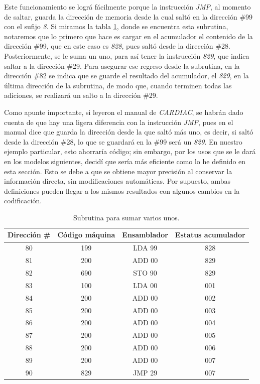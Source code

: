 \documentclass[letterpaper,12pt,oneside]{book}
\begin{document}
	Este funcionamiento se lográ fácilmente porque la instrucción \textit{JMP}, al momento de saltar, guarda la 
	dirección de memoria desde la cual saltó en la dirección \#99 con el sufijo \textit{8}. Si miramos la tabla \ref{tab:subrutina}, donde se encuentra
	esta subrutina, notaremos que lo primero que hace es cargar en el acumulador el contenido de la dirección \#99, que en
	este caso es \textit{828}, pues saltó desde la dirección \#28. Posteriormente, se le suma un uno,
	para así tener la instrucción \textit{829}, que indica saltar a la dirección \#29. Para asegurar ese regreso desde la subrutina, en la dirección
	\#82 se indica que se guarde el resultado del acumulador, el \textit{829}, en la última dirección de la subrutina, de modo que, cuando terminen todas las adiciones,
	se realizará un salto a la dirección \#29.
	
	Como apunte importante, si leyeron el manual
	de \textit{CARDIAC}, se habrán dado cuenta de que hay una ligera diferencia con la instrucción \textit{JMP}, pues en el manual dice que guarda la dirección
	desde la que saltó más uno, es decir, si saltó desde la dirección \#28, lo que se guardará en la \#99 será  un \textit{829}. En nuestro ejemplo particular, esto ahorraría código; sin embargo, por los usos que se le dará en los modelos siguientes, decidí que sería más eficiente como lo he definido en esta sección. Esto se debe a que se obtiene mayor precisión al conservar la información directa, sin modificaciones automáticas. Por supuesto, ambas definiciones pueden llegar a los
	mismos resultados con algunos cambios en la codificación.
	
	\begin{table}[h]
	  \centering
	  \begin{tabular}{|c|c|c|c|}
	    \hline
    	\textbf{Dirección \#} & \textbf{Código máquina} & \textbf{Ensamblador} & \textbf{Estatus acumulador} \\
	    \hline
	     80 & 199 & LDA 99 & 828 \\
	     81 & 200 & ADD 00 & 829 \\
	     82 & 690 & STO 90 & 829 \\
	     83 & 100 & LDA 00 & 001 \\
	     84 & 200 & ADD 00 & 002 \\
	     85 & 200 & ADD 00 & 003 \\
	     86 & 200 & ADD 00 & 004 \\
	     87 & 200 & ADD 00 & 005 \\
	     88 & 200 & ADD 00 & 006 \\
	     89 & 200 & ADD 00 & 007 \\
	     90 & 829 & JMP 29 & 007 \\
	    \hline
	  \end{tabular}
	  \caption{Subrutina para sumar varios unos.}
	  \label{tab:subrutina}
	\end{table}
	
\end{document}
